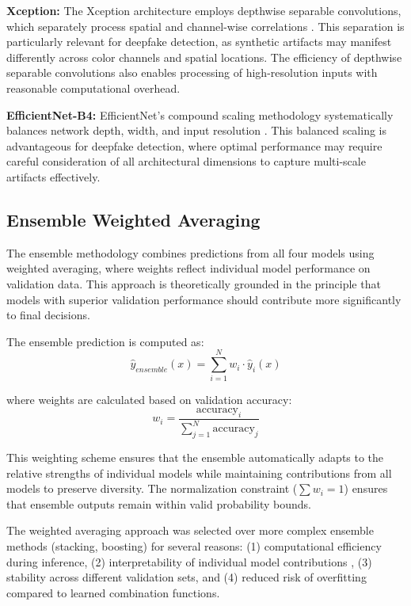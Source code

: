 \documentclass[conference]{IEEEtran}
\begin{document}
\textbf{Xception:} The Xception architecture employs depthwise separable convolutions, which separately process spatial and channel-wise correlations \cite{chollet2017xception}. This separation is particularly relevant for deepfake detection, as synthetic artifacts may manifest differently across color channels and spatial locations. The efficiency of depthwise separable convolutions also enables processing of high-resolution inputs with reasonable computational overhead.

\textbf{EfficientNet-B4:} EfficientNet's compound scaling methodology systematically balances network depth, width, and input resolution \cite{tan2019efficientnet}. This balanced scaling is advantageous for deepfake detection, where optimal performance may require careful consideration of all architectural dimensions to capture multi-scale artifacts effectively.

\subsection{Ensemble Weighted Averaging}

The ensemble methodology combines predictions from all four models using weighted averaging, where weights reflect individual model performance on validation data. This approach is theoretically grounded in the principle that models with superior validation performance should contribute more significantly to final decisions.

The ensemble prediction is computed as:
\begin{equation}
\hat{y}_{ensemble}(x) = \sum_{i=1}^{N} w_i \cdot \hat{y}_i(x)
\end{equation}

where weights are calculated based on validation accuracy:
\begin{equation}
w_i = \frac{\text{accuracy}_i}{\sum_{j=1}^{N} \text{accuracy}_j}
\end{equation}

This weighting scheme ensures that the ensemble automatically adapts to the relative strengths of individual models while maintaining contributions from all models to preserve diversity. The normalization constraint ($\sum w_i = 1$) ensures that ensemble outputs remain within valid probability bounds.

The weighted averaging approach was selected over more complex ensemble methods (stacking, boosting) for several reasons: (1) computational efficiency during inference, (2) interpretability of individual model contributions \cite{mansoor2025explainable}, (3) stability across different validation sets, and (4) reduced risk of overfitting compared to learned combination functions.
\end{document}
